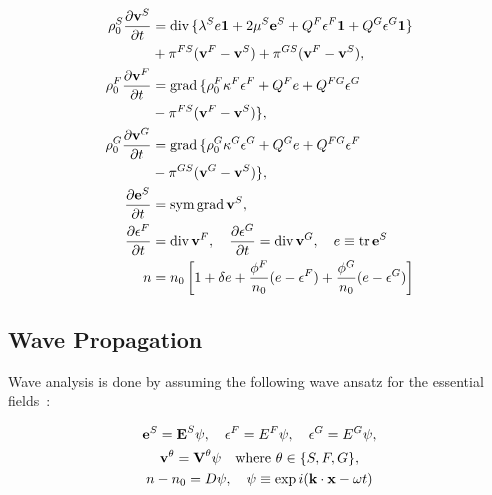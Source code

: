 \documentclass[twocolumn]{article}
\begin{document}
\begin{align}
    \rho_0^S\frac{\partial\textbf{v}^S}{\partial{t}} & = \textrm{div\,}\{\lambda^Se\textbf{1} + 2\mu^S\textbf{e}^S + Q^F\epsilon^F\textbf{1} + Q^G\epsilon^G\textbf{1}\} \\&+\pi^{FS}(\textbf{v}^F - \textbf{v}^S) + \pi^{GS}(\textbf{v}^F - \textbf{v}^S),\\
    \rho_0^F\frac{\partial\textbf{v}^F}{\partial{t}} & = \textrm{grad\,}\{\rho_0^F\kappa^F\epsilon^F + Q^Fe + Q^{FG}\epsilon^G                                           \\&- \pi^{FS}(\textbf{v}^F - \textbf{v}^S)\},\\
    \rho_0^G\frac{\partial\textbf{v}^G}{\partial{t}} & = \textrm{grad\,}\{\rho_0^G\kappa^G\epsilon^G + Q^Ge + Q^{FG}\epsilon^F                                           \\&- \pi^{GS}(\textbf{v}^G - \textbf{v}^S)\},\\
    \frac{\partial\textbf{e}^S}{\partial{t}}         & = \textrm{sym\,grad\,}\textbf{v}^S,                                                                               \\
    \frac{\partial\epsilon^F}{\partial{t}}           & = \textrm{div\,}\textbf{v}^F, \quad
    \frac{\partial\epsilon^G}{\partial{t}} = \textrm{div\,}\textbf{v}^G, \quad
    e \equiv \textrm{tr\,}\textbf{e}^S                                                                                                                                   \\
    n                                                & = n_0\left[1 + \delta{e} + \frac{\phi^F}{n_0}(e - \epsilon^F) + \frac{\phi^G}{n_0}(e - \epsilon^G)\right]
\end{align}

\subsection{Wave Propagation}
Wave analysis is done by assuming the following wave ansatz for the essential fields~\cite{detmann_analysis_2009}:

\begin{gather}
    \textbf{e}^S = \textbf{E}^S\psi, \quad \epsilon^F = E^F\psi, \quad \epsilon^G = E^G\psi,\\
    \textbf{v}^\theta = \textbf{V}^\theta\psi \quad \text{where $\theta \in \{S, F, G\}$},\\
    n - n_0 = D\psi, \quad \psi \equiv \textrm{exp\,}i(\textbf{k}\cdot\textbf{x} - \omega{t})
\end{gather}
\end{document}

